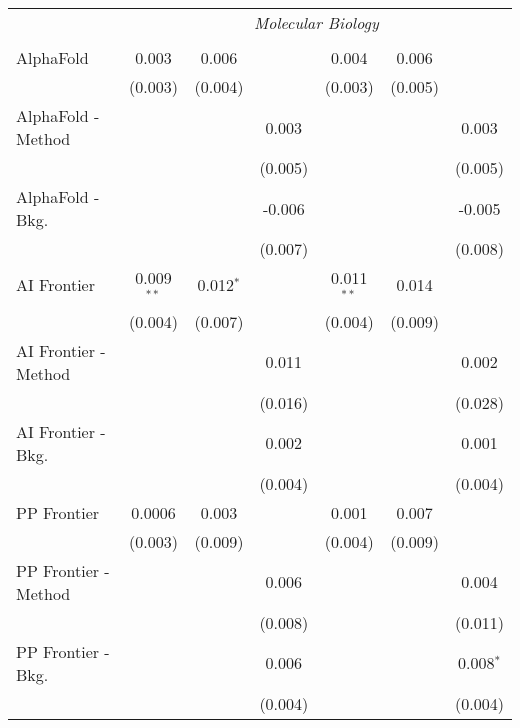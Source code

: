 \begin{tabular}{lcccccc}
 & \multicolumn{6}{c}{\textit{Molecular Biology}} \\ \\
   AlphaFold            & 0.003        & 0.006       &         & 0.004        & 0.006   &   \\   
                        & (0.003)      & (0.004)     &         & (0.003)      & (0.005) &   \\   
   AlphaFold - Method   &              &             & 0.003   &              &         & 0.003\\   
                        &              &             & (0.005) &              &         & (0.005)\\   
   AlphaFold - Bkg.     &              &             & -0.006  &              &         & -0.005\\   
                        &              &             & (0.007) &              &         & (0.008)\\   
   AI Frontier          & 0.009$^{**}$ & 0.012$^{*}$ &         & 0.011$^{**}$ & 0.014   &   \\   
                        & (0.004)      & (0.007)     &         & (0.004)      & (0.009) &   \\   
   AI Frontier - Method &              &             & 0.011   &              &         & 0.002\\   
                        &              &             & (0.016) &              &         & (0.028)\\   
   AI Frontier - Bkg.   &              &             & 0.002   &              &         & 0.001\\   
                        &              &             & (0.004) &              &         & (0.004)\\   
   PP Frontier          & 0.0006       & 0.003       &         & 0.001        & 0.007   &   \\   
                        & (0.003)      & (0.009)     &         & (0.004)      & (0.009) &   \\   
   PP Frontier - Method &              &             & 0.006   &              &         & 0.004\\   
                        &              &             & (0.008) &              &         & (0.011)\\   
   PP Frontier - Bkg.   &              &             & 0.006   &              &         & 0.008$^{*}$\\   
                        &              &             & (0.004) &              &         & (0.004)\\   

\end{tabular}
